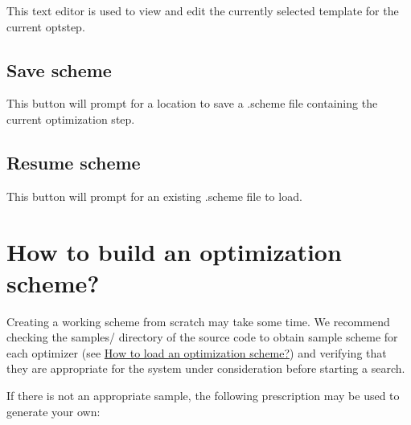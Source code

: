 This text editor is used to view and edit the currently selected template for the current optstep.\hypertarget{optschemes_gui-save}{}\subsection{Save scheme}\label{optschemes_gui-save}
This button will prompt for a location to save a .scheme file containing the current optimization step.\hypertarget{optschemes_gui-load}{}\subsection{Resume scheme}\label{optschemes_gui-load}
This button will prompt for an existing .scheme file to load.\hypertarget{optschemes_creating}{}\section{How to build an optimization scheme?}\label{optschemes_creating}
Creating a working scheme from scratch may take some time. We recommend checking the samples/ directory of the source code to obtain sample scheme for each optimizer (see \hyperlink{optschemes_loading}{How to load an optimization scheme?}) and verifying that they are appropriate for the system under consideration before starting a search.

If there is not an appropriate sample, the following prescription may be used to generate your own\-:


